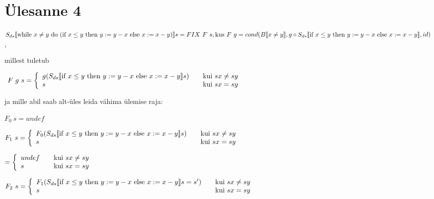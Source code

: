 \section{Ülesanne 4}

\(
S_{ds} \llbracket
\text{while\ } x \neq y \text{\ do\ }
  (\text{if\ } x \leq y
  \text{\ then\ } y := y - x \text{\ else\ } x := x - y )
\rrbracket s
= FIX \ F \ s,
\\
\text{kus} \ F \  g = cond(B \llbracket x \neq y \rrbracket, 
g \circ S_{ds} \llbracket \text{if\ } x \leq y \text{\ then\ } y := y - x
\text{\ else\ } x := x - y \rrbracket,
id
)
\),

millest tuletub 

\(
  \ F \  g \ s = \left\{
  \begin{array}{l l}
    g(
      S_{ds} \llbracket
        \text{if\ } x \leq y
        \text{\ then\ } y := y - x \text{\ else\ } x := x - y
      \rrbracket s
    ) & \quad \text{kui}\ sx \neq sy \\
    s   & \quad \text{kui}\ sx = sy\\
  \end{array} \right.
\)

ja mille abil saab alt-üles leida vähima ülemise raja:


\(
F_0 \  s = undef
\)


\(
F_1 \  s = \left\{
  \begin{array}{l l}
    F_0(
      S_{ds} \llbracket
        \text{if\ } x \leq y
        \text{\ then\ } y := y - x \text{\ else\ } x := x - y
      \rrbracket s
    ) & \quad \text{kui}\ sx \neq sy \\
    s   & \quad \text{kui}\ sx = sy\\
  \end{array} \right.
\)

\(
= \left\{
  \begin{array}{l l}
    undef & \quad \text{kui}\ sx \neq sy \\
    s   & \quad \text{kui}\ sx = sy\\
  \end{array} \right.
\)

\(
F_2 \ s = \left\{
    \begin{array}{l l}
    F_1(
      S_{ds} \llbracket
        \text{if\ } x \leq y
        \text{\ then\ } y := y - x \text{\ else\ } x := x - y
      \rrbracket s = s'
    ) & \quad \text{kui}\ sx \neq sy \\
    s   & \quad \text{kui}\ sx = sy\\
  \end{array} \right.
\)

